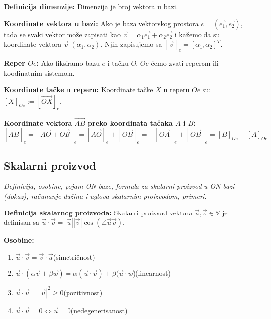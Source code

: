 \documentclass[12pt]{article}
\newcommand{\vek}[1]{\overrightarrow{#1}}
\begin{document}
\textbf{Definicija dimenzije:} Dimenzija je broj vektora u bazi.
\par

\textbf{Koordinate vektora u bazi:} Ako je baza vektorskog prostora
$e=(\vek{e_1}, \vek{e_2})$, tada se svaki vektor može zapisati kao
$\vek{v}=\alpha_1\vek{e_1}+\alpha_2\vek{e_2}$ i kažemo da su koordinate
vektora $\vek{v}$ $(\alpha_1, \alpha_2)$. Njih zapisujemo sa
$[\vek{v}]_e=[\alpha_1, \alpha_2]^T$.
\par

\textbf{Reper $Oe$:} Ako fiksiramo bazu $e$ i tačku $O$, $Oe$ ćemo zvati reperom
ili koodinatnim sistemom.
\par

\textbf{Koordinate tačke u reperu:} Koordinate tačke $X$ u reperu $Oe$ su:
$[X]_{Oe}:=[\vek{OX}]_e$.
\par

\textbf{Koordinate vektora $\vek{AB}$ preko koordinata tačaka $A$ i $B$:}
$$[\vek{AB}]_e=[\vek{AO}+\vek{OB}]_e=[\vek{AO}]_e+[\vek{OB}]_e=
    -[\vek{OA}]_e+[\vek{OB}]_e=[B]_{Oe}-[A]_{Oe}$$


\subsection{Skalarni proizvod}
\textit{Definicija, osobine, pojam ON baze, formula za skalarni proizvod u ON
    bazi (dokaz), računanje dužina i uglova skalarnim proizvodom, primeri.}
\par
\vspace*{1cm}

\textbf{Definicija skalarnog proizvoda:} Skalarni proizvod vektora
$\vek{u},\vek{v}\in\mathbb{V}$ je definisan sa $\vek{u}\cdot\vek{v}=|\vek{u}|
    |\vek{v}|\cos(\angle{\vek{u}\vek{v}})$.
\par

\textbf{Osobine:}
\begin{enumerate}[label=\textbf{(\arabic*)}]
    \item $\vek{u}\cdot\vek{v}=\vek{v}\cdot\vek{u}$\hspace*{1cm}(simetričnost)
    \item $\vek{u}\cdot(\alpha\vek{v}+\beta\vek{w})=\alpha(\vek{u}\cdot\vek{v})
          +\beta(\vek{u}\cdot\vek{w}$)\hspace*{1cm}(linearnost)
    \item $\vek{u}\cdot\vek{u}=|\vek{u}|^2\geq0$\hspace*{1cm}(pozitivnost)
    \item $\vek{u}\cdot\vek{u}=0\iff\vek{u}=0$\hspace*{1cm}(nedegenerisanost)
\end{enumerate}
\par
\end{document}
